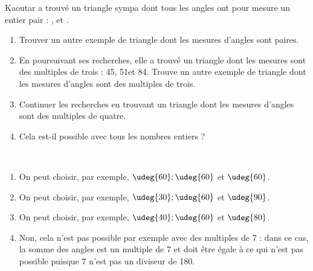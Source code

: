 \begin{colonne*exercice}
\medskip


\begin{exercice} %
   Kaoutar a trouvé un triangle sympa dont tous les angles ont pour mesure un entier pair : ,  et .
   \begin{enumerate}
      \item Trouver un autre exemple de triangle dont les mesures d'angles sont paires.
      \item En poursuivant ses recherches, elle a trouvé un triangle dont les mesures sont des multiples de trois : 45\degre, 51\degre et 84\degre. Trouve un autre exemple de triangle dont les mesures d'angles sont des multiples de trois.
      \item Continuer les recherches en trouvant un triangle dont les mesures d'angles sont des multiples de quatre.
      \item Cela est-il possible avec tous les nombres entiers ?
   \end{enumerate}
\end{exercice}

\begin{corrige}
   \ \\ [-5mm]
   \begin{enumerate}
      \item On peut choisir, par exemple, {\blue $\udeg{60} ; \udeg{60}$ et $\udeg{60}$}.
      \item On peut choisir, par exemple, {\blue $\udeg{30} ; \udeg{60}$ et $\udeg{90}$}.
      \item On peut choisir, par exemple, {\blue $\udeg{40} ; \udeg{60}$ et $\udeg{80}$}.
      \item {\blue Non}, cela n'est pas possible par exemple avec des multiples de 7 : dans ce cas, la somme des angles est un multiple de 7 et doit être égale à  ce qui n'est pas possible puisque 7 n'est pas un diviseur de 180.
   \end{enumerate}
\end{corrige}

\medskip



\end{colonne*exercice}
